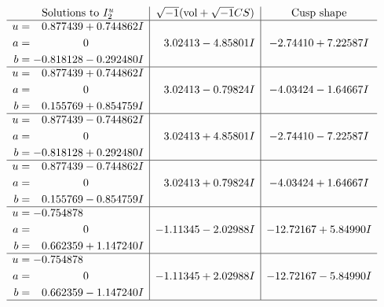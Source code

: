 \documentclass[1p]{elsarticle_modified}
\theoremstyle{definition}
\newcommand{\I}{\sqrt{-1}}
\begin{document}
$$\begin{array}{c|c|c}  
\text{Solutions to }I^u_{2}& \I (\text{vol} + \sqrt{-1}CS) & \text{Cusp shape}\\
 \hline 
\begin{aligned}
u &= \phantom{-}0.877439 + 0.744862 I \\
a &= \phantom{-0.000000 } 0 \\
b &= -0.818128 - 0.292480 I\end{aligned}
 & \phantom{-}3.02413 - 4.85801 I & -2.74410 + 7.22587 I \\ \hline\begin{aligned}
u &= \phantom{-}0.877439 + 0.744862 I \\
a &= \phantom{-0.000000 } 0 \\
b &= \phantom{-}0.155769 + 0.854759 I\end{aligned}
 & \phantom{-}3.02413 - 0.79824 I & -4.03424 - 1.64667 I \\ \hline\begin{aligned}
u &= \phantom{-}0.877439 - 0.744862 I \\
a &= \phantom{-0.000000 } 0 \\
b &= -0.818128 + 0.292480 I\end{aligned}
 & \phantom{-}3.02413 + 4.85801 I & -2.74410 - 7.22587 I \\ \hline\begin{aligned}
u &= \phantom{-}0.877439 - 0.744862 I \\
a &= \phantom{-0.000000 } 0 \\
b &= \phantom{-}0.155769 - 0.854759 I\end{aligned}
 & \phantom{-}3.02413 + 0.79824 I & -4.03424 + 1.64667 I \\ \hline\begin{aligned}
u &= -0.754878\phantom{ +0.000000I} \\
a &= \phantom{-0.000000 } 0 \\
b &= \phantom{-}0.662359 + 1.147240 I\end{aligned}
 & -1.11345 - 2.02988 I & -12.72167 + 5.84990 I \\ \hline\begin{aligned}
u &= -0.754878\phantom{ +0.000000I} \\
a &= \phantom{-0.000000 } 0 \\
b &= \phantom{-}0.662359 - 1.147240 I\end{aligned}
 & -1.11345 + 2.02988 I & -12.72167 - 5.84990 I\\
 \hline 
 \end{array}$$\newpage
\end{document}
